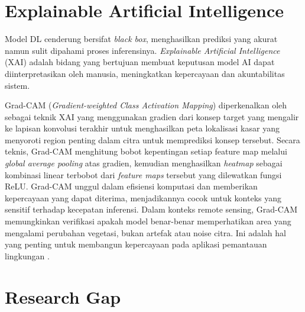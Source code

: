 \section{Explainable Artificial Intelligence}




Model DL cenderung bersifat \textit{black box}, menghasilkan prediksi yang akurat namun sulit dipahami proses inferensinya. \textit{Explainable Artificial Intelligence} (XAI) adalah bidang yang bertujuan membuat keputusan model AI dapat diinterpretasikan oleh manusia, meningkatkan kepercayaan dan akuntabilitas sistem.

Grad-CAM (\textit{Gradient-weighted Class Activation Mapping}) diperkenalkan oleh \cite{DBLP:journals/corr/SelvarajuDVCPB16} sebagai teknik XAI yang menggunakan gradien dari konsep target yang mengalir ke lapisan konvolusi terakhir untuk menghasilkan peta lokalisasi kasar yang menyoroti region penting dalam citra untuk memprediksi konsep tersebut. Secara teknis, Grad-CAM menghitung bobot kepentingan setiap feature map melalui \textit{global average pooling} atas gradien, kemudian menghasilkan \textit{heatmap} sebagai kombinasi linear terbobot dari \textit{feature maps} tersebut yang dilewatkan fungsi ReLU. Grad-CAM unggul dalam efisiensi komputasi dan memberikan kepercayaan yang dapat diterima, menjadikannya cocok untuk konteks yang sensitif terhadap kecepatan inferensi. Dalam konteks remote sensing, Grad-CAM memungkinkan verifikasi apakah model benar-benar memperhatikan area yang mengalami perubahan vegetasi, bukan artefak atau noise citra. Ini adalah hal yang penting untuk membangun kepercayaan pada aplikasi pemantauan lingkungan \citep{Cheng2025}.

\section{Research Gap}



